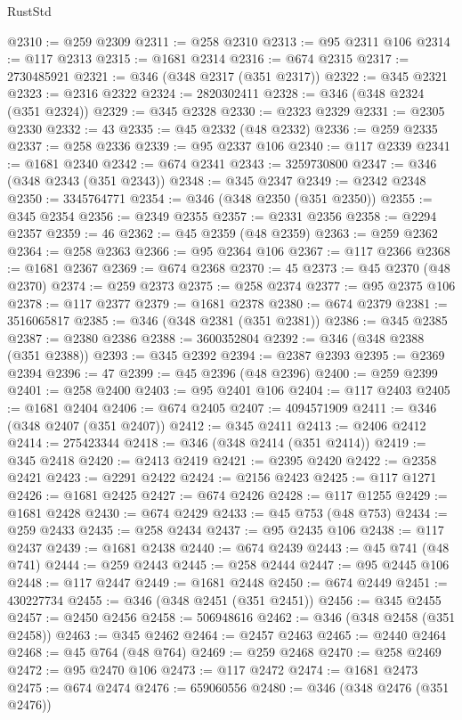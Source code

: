 \begin{lexlean}{RustStd}
\begin{coremodule}
{\begin{coremodule}
{{{{{{{{{{{{{{{{{{{{{{{{{{{{{{{{{{{{{{{@2310 := @259 @2309
@2311 := @258 @2310
@2313 := @95 @2311 @106
@2314 := @117 @2313
@2315 := @1681 @2314
@2316 := @674 @2315
@2317 := 2730485921
@2321 := @346 (@348 @2317 (@351 @2317))
@2322 := @345 @2321
@2323 := @2316 @2322
@2324 := 2820302411
@2328 := @346 (@348 @2324 (@351 @2324))
@2329 := @345 @2328
@2330 := @2323 @2329
@2331 := @2305 @2330
@2332 := 43
@2335 := @45 @2332 (@48 @2332)
@2336 := @259 @2335
@2337 := @258 @2336
@2339 := @95 @2337 @106
@2340 := @117 @2339
@2341 := @1681 @2340
@2342 := @674 @2341
@2343 := 3259730800
@2347 := @346 (@348 @2343 (@351 @2343))
@2348 := @345 @2347
@2349 := @2342 @2348
@2350 := 3345764771
@2354 := @346 (@348 @2350 (@351 @2350))
@2355 := @345 @2354
@2356 := @2349 @2355
@2357 := @2331 @2356
@2358 := @2294 @2357
@2359 := 46
@2362 := @45 @2359 (@48 @2359)
@2363 := @259 @2362
@2364 := @258 @2363
@2366 := @95 @2364 @106
@2367 := @117 @2366
@2368 := @1681 @2367
@2369 := @674 @2368
@2370 := 45
@2373 := @45 @2370 (@48 @2370)
@2374 := @259 @2373
@2375 := @258 @2374
@2377 := @95 @2375 @106
@2378 := @117 @2377
@2379 := @1681 @2378
@2380 := @674 @2379
@2381 := 3516065817
@2385 := @346 (@348 @2381 (@351 @2381))
@2386 := @345 @2385
@2387 := @2380 @2386
@2388 := 3600352804
@2392 := @346 (@348 @2388 (@351 @2388))
@2393 := @345 @2392
@2394 := @2387 @2393
@2395 := @2369 @2394
@2396 := 47
@2399 := @45 @2396 (@48 @2396)
@2400 := @259 @2399
@2401 := @258 @2400
@2403 := @95 @2401 @106
@2404 := @117 @2403
@2405 := @1681 @2404
@2406 := @674 @2405
@2407 := 4094571909
@2411 := @346 (@348 @2407 (@351 @2407))
@2412 := @345 @2411
@2413 := @2406 @2412
@2414 := 275423344
@2418 := @346 (@348 @2414 (@351 @2414))
@2419 := @345 @2418
@2420 := @2413 @2419
@2421 := @2395 @2420
@2422 := @2358 @2421
@2423 := @2291 @2422
@2424 := @2156 @2423
@2425 := @117 @1271
@2426 := @1681 @2425
@2427 := @674 @2426
@2428 := @117 @1255
@2429 := @1681 @2428
@2430 := @674 @2429
@2433 := @45 @753 (@48 @753)
@2434 := @259 @2433
@2435 := @258 @2434
@2437 := @95 @2435 @106
@2438 := @117 @2437
@2439 := @1681 @2438
@2440 := @674 @2439
@2443 := @45 @741 (@48 @741)
@2444 := @259 @2443
@2445 := @258 @2444
@2447 := @95 @2445 @106
@2448 := @117 @2447
@2449 := @1681 @2448
@2450 := @674 @2449
@2451 := 430227734
@2455 := @346 (@348 @2451 (@351 @2451))
@2456 := @345 @2455
@2457 := @2450 @2456
@2458 := 506948616
@2462 := @346 (@348 @2458 (@351 @2458))
@2463 := @345 @2462
@2464 := @2457 @2463
@2465 := @2440 @2464
@2468 := @45 @764 (@48 @764)
@2469 := @259 @2468
@2470 := @258 @2469
@2472 := @95 @2470 @106
@2473 := @117 @2472
@2474 := @1681 @2473
@2475 := @674 @2474
@2476 := 659060556
@2480 := @346 (@348 @2476 (@351 @2476))
}}}}}}}}}}}}}}}}}}}}}}}}}}}}}}}}}}}}}}}
\end{coremodule}}
\end{coremodule}
\end{lexlean}

